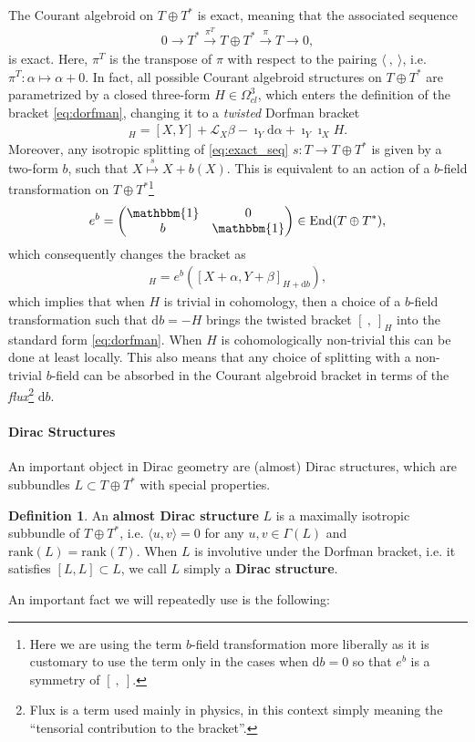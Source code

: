\documentclass[letterpaper,12pt]{article}
\newcommand{\TT}{{T\oplus T^*}}
\newcommand{\id}{\mathbbm{1}}
\newcommand{\Lie}{\mathcal{L}}
\newcommand{\ap}{\alpha}
\newcommand{\bt}{\beta}
\newcommand{\rd}{\mathrm{d}}
\newcommand{\se}{\Gamma}
\newcommand{\la}{\langle}
\newcommand{\ra}{\rangle}
\newcommand{\lara}{\la\ ,\ \ra}
\newcommand{\brac}{[\ ,\ ]}
\theoremstyle{definition}
\newtheorem{Def}[theorem]{Definition}
\theoremstyle{remark}
\theoremstyle{examples}
\DeclareMathOperator{\End}{End}
\begin{document}
The Courant algebroid on $\TT$ is exact, meaning that the associated sequence
\begin{align}\label{eq:exact_seq}
0\longrightarrow T^* \overset{\pi^T}{\longrightarrow} \TT\overset{\pi}{\longrightarrow} T\longrightarrow 0,
\end{align}
is exact. Here, $\pi^T$ is the transpose of $\pi$ with respect to the pairing $\lara$,
i.e. $\pi^T: \ap \mapsto \ap+0$. In fact, all possible Courant algebroid structures on $\TT$ are parametrized by a closed three-form $H\in \Omega^3_{cl}$, which enters the definition of the bracket \eqref{eq:dorfman}, changing it to a {\it twisted} Dorfman bracket
\begin{align*}
[ X+\ap,Y+\bt]_H=[X,Y]+\Lie_X\bt-\imath_Y\rd \ap+\imath_Y\imath_X H.
\end{align*}
Moreover, any isotropic splitting of \eqref{eq:exact_seq} $s:T\rightarrow \TT$ is given by a two-form $b$, such that $X\overset{s}{\mapsto}X+b(X)$. This is equivalent to an action of a $b$-field transformation on $\TT$\footnote{Here we are using the term $b$-field transformation more liberally as it is customary to use the term only in the cases when $\rd b=0$ so that $e^b$ is a symmetry of $\brac$.}
\begin{align*}
e^b=
\begin{pmatrix}
\id & 0 \\
b & \id
\end{pmatrix}
\in \End(\TT),
\end{align*}
which consequently changes the bracket as
\begin{align*}
[ e^b(X+\ap),e^b(Y+\bt)]_H=e^b([ X+\ap,Y+\bt]_{H+\rd b}),
\end{align*}
which implies that when $H$ is trivial in cohomology, then a choice of a $b$-field transformation such that $\rd b=-H$ brings the twisted bracket $\brac_H$ into the standard form \eqref{eq:dorfman}. When $H$ is cohomologically non-trivial this can be done at least locally. This also means that any choice of splitting with a non-trivial $b$-field can be absorbed in the Courant algebroid bracket in terms of the {\it flux}\footnote{Flux is a term used mainly in physics, in this context simply meaning the ``tensorial contribution to the bracket''.} $\rd b$.

\paragraph{Dirac Structures}
An important object in Dirac geometry are (almost) Dirac structures, which are subbundles $L\subset \TT$ with special properties.
\begin{Def}
An {\bf almost Dirac structure} $L$ is a maximally isotropic subbundle of $\TT$, i.e. $\la u,v\ra=0$ for any $u,v \in \se(L)$ and $\text{rank}(L)=\text{rank}(T)$. When $L$ is involutive under the Dorfman bracket, i.e. it satisfies $[L,L]\subset L$, we call $L$ simply a {\bf Dirac structure}.
\end{Def}
An important fact we will repeatedly use is the following:
\end{document}
